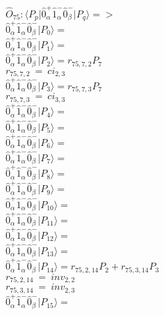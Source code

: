 \documentclass[14pt]{article}
\begin{document}
    $\hat{O}_{75}:  \langle{P_p}\vert \hat{0}_{\alpha}^{+}\hat{1}_{\alpha}^{-}\hat{0}_{\beta}^{-} \vert{P_q}\rangle => $ \\ 
    $ \hat{0}_{\alpha}^{+}\hat{1}_{\alpha}^{-}\hat{0}_{\beta}^{-} \vert{P_{0}}\rangle =  $ \\ 
    $ \hat{0}_{\alpha}^{+}\hat{1}_{\alpha}^{-}\hat{0}_{\beta}^{-} \vert{P_{1}}\rangle =  $ \\ 
    $ \hat{0}_{\alpha}^{+}\hat{1}_{\alpha}^{-}\hat{0}_{\beta}^{-} \vert{P_{2}}\rangle = {r}_{75,7,2}P_{7} $ \\ 
    ${r}_{75,7,2}\ =\ {ci}_{2,3} $ \\ 
    $ \hat{0}_{\alpha}^{+}\hat{1}_{\alpha}^{-}\hat{0}_{\beta}^{-} \vert{P_{3}}\rangle = {r}_{75,7,3}P_{7} $ \\ 
    ${r}_{75,7,3}\ =\ {ci}_{3,3} $ \\ 
    $ \hat{0}_{\alpha}^{+}\hat{1}_{\alpha}^{-}\hat{0}_{\beta}^{-} \vert{P_{4}}\rangle =  $ \\ 
    $ \hat{0}_{\alpha}^{+}\hat{1}_{\alpha}^{-}\hat{0}_{\beta}^{-} \vert{P_{5}}\rangle =  $ \\ 
    $ \hat{0}_{\alpha}^{+}\hat{1}_{\alpha}^{-}\hat{0}_{\beta}^{-} \vert{P_{6}}\rangle =  $ \\ 
    $ \hat{0}_{\alpha}^{+}\hat{1}_{\alpha}^{-}\hat{0}_{\beta}^{-} \vert{P_{7}}\rangle =  $ \\ 
    $ \hat{0}_{\alpha}^{+}\hat{1}_{\alpha}^{-}\hat{0}_{\beta}^{-} \vert{P_{8}}\rangle =  $ \\ 
    $ \hat{0}_{\alpha}^{+}\hat{1}_{\alpha}^{-}\hat{0}_{\beta}^{-} \vert{P_{9}}\rangle =  $ \\ 
    $ \hat{0}_{\alpha}^{+}\hat{1}_{\alpha}^{-}\hat{0}_{\beta}^{-} \vert{P_{10}}\rangle =  $ \\ 
    $ \hat{0}_{\alpha}^{+}\hat{1}_{\alpha}^{-}\hat{0}_{\beta}^{-} \vert{P_{11}}\rangle =  $ \\ 
    $ \hat{0}_{\alpha}^{+}\hat{1}_{\alpha}^{-}\hat{0}_{\beta}^{-} \vert{P_{12}}\rangle =  $ \\ 
    $ \hat{0}_{\alpha}^{+}\hat{1}_{\alpha}^{-}\hat{0}_{\beta}^{-} \vert{P_{13}}\rangle =  $ \\ 
    $ \hat{0}_{\alpha}^{+}\hat{1}_{\alpha}^{-}\hat{0}_{\beta}^{-} \vert{P_{14}}\rangle = {r}_{75,2,14}P_{2}+{r}_{75,3,14}P_{3} $ \\ 
    ${r}_{75,2,14}\ =\ {inv}_{2,2} $ \\ 
    ${r}_{75,3,14}\ =\ {inv}_{2,3} $ \\ 
    $ \hat{0}_{\alpha}^{+}\hat{1}_{\alpha}^{-}\hat{0}_{\beta}^{-} \vert{P_{15}}\rangle =  $ \\ 
    
\end{document}
